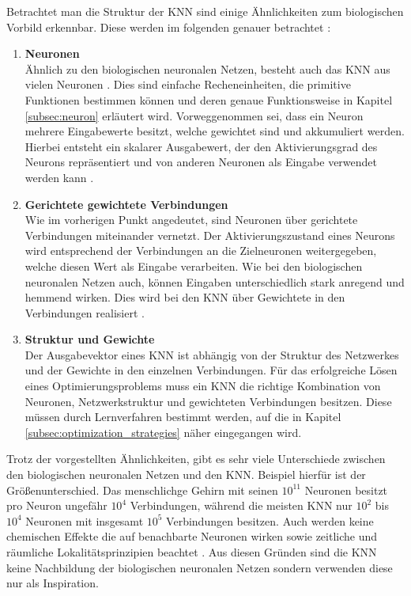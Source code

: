 Betrachtet man die Struktur der \ac{KNN} sind einige Ähnlichkeiten zum biologischen Vorbild erkennbar. Diese werden im folgenden genauer betrachtet \cite{zell2003simulation}:
\begin{enumerate}
	\item \textbf{Neuronen}\\
	Ähnlich zu den biologischen neuronalen Netzen, besteht auch das \ac{KNN} aus vielen Neuronen \cite{zell2003simulation}. Dies sind einfache Recheneinheiten, die primitive Funktionen bestimmen können \cite{scherer2013neuronale} und deren genaue Funktionsweise in Kapitel \ref{subsec:neuron} erläutert wird. Vorweggenommen sei, dass ein Neuron mehrere Eingabewerte besitzt, welche gewichtet sind und akkumuliert werden. Hierbei entsteht ein skalarer Ausgabewert, der den Aktivierungsgrad des Neurons repräsentiert und von anderen Neuronen als Eingabe verwendet werden kann \cite{kriesel2008kleiner}. 
	 
	\item \textbf{Gerichtete gewichtete Verbindungen}\\
	Wie im vorherigen Punkt angedeutet, sind Neuronen über gerichtete Verbindungen miteinander vernetzt. Der Aktivierungszustand eines Neurons wird entsprechend der Verbindungen an die Zielneuronen weitergegeben, welche diesen Wert als Eingabe verarbeiten. Wie bei den biologischen neuronalen Netzen auch, können Eingaben unterschiedlich stark anregend und hemmend wirken. Dies wird bei den \ac{KNN} über Gewichtete in den Verbindungen realisiert \cite{zell2003simulation}.
	
	\item \textbf{Struktur und Gewichte}\\
	Der Ausgabevektor eines \ac{KNN} ist abhängig von der Struktur des Netzwerkes und der Gewichte in den einzelnen Verbindungen.
	Für das erfolgreiche Lösen eines Optimierungsproblems muss ein \ac{KNN} die richtige Kombination von Neuronen, Netzwerkstruktur und gewichteten Verbindungen besitzen. Diese müssen durch Lernverfahren bestimmt werden, auf die in Kapitel \ref{subsec:optimization_strategies} näher eingegangen wird.
\end{enumerate}
Trotz der vorgestellten Ähnlichkeiten, gibt es sehr viele Unterschiede zwischen den biologischen neuronalen Netzen und den \ac{KNN}. Beispiel hierfür ist der Größenunterschied. Das menschlichge Gehirn mit seinen ${10}^{11}$ Neuronen besitzt pro Neuron ungefähr $10^4$ Verbindungen, während die meisten \ac{KNN} nur ${10}^{2}$ bis ${10}^{4}$ Neuronen mit insgesamt ${10}^{5}$ Verbindungen besitzen. Auch werden keine chemischen Effekte die auf benachbarte Neuronen wirken sowie zeitliche und räumliche Lokalitätsprinzipien beachtet \cite{zell2003simulation}. Aus diesen Gründen sind die \ac{KNN} keine Nachbildung der biologischen neuronalen Netzen sondern verwenden diese nur als Inspiration. 

